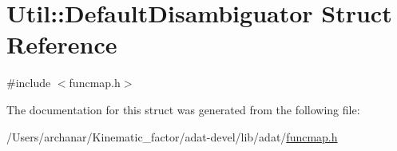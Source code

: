 \hypertarget{structUtil_1_1DefaultDisambiguator}{}\section{Util\+:\+:Default\+Disambiguator Struct Reference}
\label{structUtil_1_1DefaultDisambiguator}


{\ttfamily \#include $<$funcmap.\+h$>$}



The documentation for this struct was generated from the following file\+:\begin{DoxyCompactItemize}
\item 
/\+Users/archanar/\+Kinematic\+\_\+factor/adat-\/devel/lib/adat/\mbox{\hyperlink{adat-devel_2lib_2adat_2funcmap_8h}{funcmap.\+h}}\end{DoxyCompactItemize}
